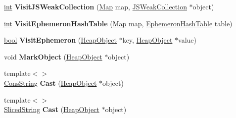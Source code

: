 \begin{DoxyCompactItemize}
\item 
\mbox{\label{classv8_1_1internal_1_1ConcurrentMarkingVisitor_ae2729be5dd8cefb48f601a637af58638}} 
\mbox{\hyperlink{classint}{int}} {\bfseries Visit\+J\+S\+Weak\+Collection} (\mbox{\hyperlink{classv8_1_1internal_1_1Map}{Map}} map, \mbox{\hyperlink{classv8_1_1internal_1_1JSWeakCollection}{J\+S\+Weak\+Collection}} $\ast$object)
\item 
\mbox{\label{classv8_1_1internal_1_1ConcurrentMarkingVisitor_a74d0503395c56936a1fc3b09a8762672}} 
\mbox{\hyperlink{classint}{int}} {\bfseries Visit\+Ephemeron\+Hash\+Table} (\mbox{\hyperlink{classv8_1_1internal_1_1Map}{Map}} map, \mbox{\hyperlink{classv8_1_1internal_1_1EphemeronHashTable}{Ephemeron\+Hash\+Table}} table)
\item 
\mbox{\label{classv8_1_1internal_1_1ConcurrentMarkingVisitor_a369869135c49011a3d4f9854db3472df}} 
\mbox{\hyperlink{classbool}{bool}} {\bfseries Visit\+Ephemeron} (\mbox{\hyperlink{classv8_1_1internal_1_1HeapObject}{Heap\+Object}} $\ast$key, \mbox{\hyperlink{classv8_1_1internal_1_1HeapObject}{Heap\+Object}} $\ast$value)
\item 
\mbox{\label{classv8_1_1internal_1_1ConcurrentMarkingVisitor_a9c368bf3dffd62a81b162dc4f2e34f08}} 
void {\bfseries Mark\+Object} (\mbox{\hyperlink{classv8_1_1internal_1_1HeapObject}{Heap\+Object}} $\ast$object)
\item 
\mbox{\label{classv8_1_1internal_1_1ConcurrentMarkingVisitor_a91ee3c06cb03b5f2ae84e80b974325d5}} 
{\footnotesize template$<$$>$ }\\\mbox{\hyperlink{classv8_1_1internal_1_1ConsString}{Cons\+String}} {\bfseries Cast} (\mbox{\hyperlink{classv8_1_1internal_1_1HeapObject}{Heap\+Object}} $\ast$object)
\item 
\mbox{\label{classv8_1_1internal_1_1ConcurrentMarkingVisitor_a5a5fee2002e26d6a811791e4699fe8c9}} 
{\footnotesize template$<$$>$ }\\\mbox{\hyperlink{classv8_1_1internal_1_1SlicedString}{Sliced\+String}} {\bfseries Cast} (\mbox{\hyperlink{classv8_1_1internal_1_1HeapObject}{Heap\+Object}} $\ast$object)

\end{DoxyCompactItemize}
